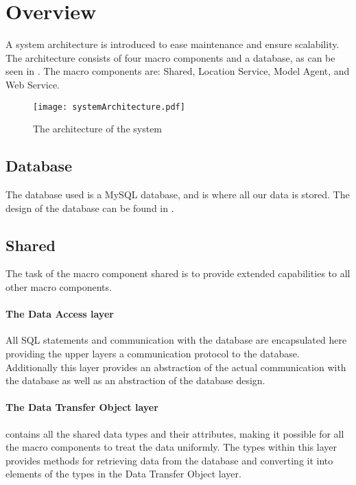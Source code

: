 \section{Overview}
A system architecture is introduced to ease maintenance and ensure scalability.
The architecture consists of four macro components and a database, as can be seen in . The macro components are: Shared, Location Service, Model Agent, and Web Service.

\begin{figure}
\texttt{[image: systemArchitecture.pdf]}
\caption{The architecture of the system}
\label{fig:architecture}
\end{figure}

\subsection{Database} The database used is a MySQL database, and is where all our data is stored.
The design of the database can be found in .

\subsection{Shared}
The task of the macro component shared is to provide extended capabilities to all other macro components.

\paragraph{The Data Access layer} All SQL statements and communication with the database are encapsulated here providing the upper layers a communication protocol to the database.
Additionally this layer provides an abstraction of the actual communication with the database as well as an abstraction of the database design.

\paragraph{The Data Transfer Object layer} contains all the shared data types and their attributes, making it possible for all the macro components to treat the data uniformly.
The types within this layer provides methods for retrieving data from the database and converting it into elements of the types in the Data Transfer Object layer.

